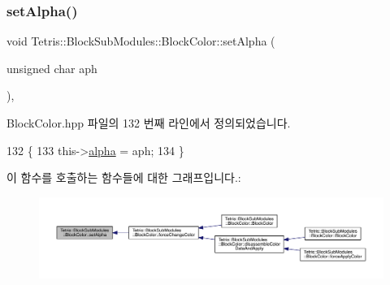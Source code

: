 \mbox{\label{class_tetris_1_1_block_sub_modules_1_1_block_color_a5fdd2d1a53d92ec0bcc1c25748b890e0}} 
\subsubsection{\texorpdfstring{set\+Alpha()}{setAlpha()}}
{\footnotesize\ttfamily void Tetris\+::\+Block\+Sub\+Modules\+::\+Block\+Color\+::set\+Alpha (\begin{DoxyParamCaption}\item[{unsigned char}]{aph }\end{DoxyParamCaption})\hspace{0.3cm}{\ttfamily [inline]}, {\ttfamily [protected]}}



Block\+Color.\+hpp 파일의 132 번째 라인에서 정의되었습니다.


\begin{DoxyCode}
132                                             \{
133                 this->\hyperlink{class_tetris_1_1_block_sub_modules_1_1_block_color_af0983ea684f33617a0b482cfea1d3c2b}{alpha} = aph;
134             \}
\end{DoxyCode}
이 함수를 호출하는 함수들에 대한 그래프입니다.\+:
\nopagebreak
\begin{figure}[H]
\begin{center}
\leavevmode
\includegraphics[width=350pt]{de/d44/class_tetris_1_1_block_sub_modules_1_1_block_color_a5fdd2d1a53d92ec0bcc1c25748b890e0_icgraph}
\end{center}
\end{figure}
\mbox{\label{class_tetris_1_1_block_sub_modules_1_1_block_color_ac624156bd1f77a20d6e1d4c8cbff36d3}} 
